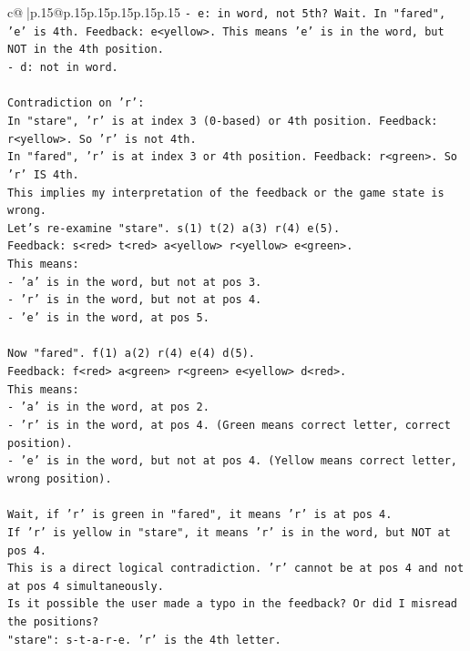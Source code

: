 \documentclass{article}
\begin{document}
{\begin{supertabular}{c@{$\;$}|p{.15\linewidth}@{}p{.15\linewidth}p{.15\linewidth}p{.15\linewidth}p{.15\linewidth}p{.15\linewidth}}
{{{\texttt{{-} e: in word, not 5th? Wait. In "fared", 'e' is 4th. Feedback: e<yellow>. This means 'e' is in the word, but NOT in the 4th position.} \\
\texttt{{-} d: not in word.} \\
\\ 
\texttt{Contradiction on 'r':} \\
\texttt{In "stare", 'r' is at index 3 (0{-}based) or 4th position. Feedback: r<yellow>. So 'r' is not 4th.} \\
\texttt{In "fared", 'r' is at index 3 or 4th position. Feedback: r<green>. So 'r' IS 4th.} \\
\texttt{This implies my interpretation of the feedback or the game state is wrong.} \\
\texttt{Let's re{-}examine "stare". s(1) t(2) a(3) r(4) e(5).} \\
\texttt{Feedback: s<red> t<red> a<yellow> r<yellow> e<green>.} \\
\texttt{This means:} \\
\texttt{{-} 'a' is in the word, but not at pos 3.} \\
\texttt{{-} 'r' is in the word, but not at pos 4.} \\
\texttt{{-} 'e' is in the word, at pos 5.} \\
\\ 
\texttt{Now "fared". f(1) a(2) r(4) e(4) d(5).} \\
\texttt{Feedback: f<red> a<green> r<green> e<yellow> d<red>.} \\
\texttt{This means:} \\
\texttt{{-} 'a' is in the word, at pos 2.} \\
\texttt{{-} 'r' is in the word, at pos 4. (Green means correct letter, correct position).} \\
\texttt{{-} 'e' is in the word, but not at pos 4. (Yellow means correct letter, wrong position).} \\
\\ 
\texttt{Wait, if 'r' is green in "fared", it means 'r' is at pos 4.} \\
\texttt{If 'r' is yellow in "stare", it means 'r' is in the word, but NOT at pos 4.} \\
\texttt{This is a direct logical contradiction. 'r' cannot be at pos 4 and not at pos 4 simultaneously.} \\
\texttt{Is it possible the user made a typo in the feedback? Or did I misread the positions?} \\
\texttt{"stare": s{-}t{-}a{-}r{-}e. 'r' is the 4th letter.} \\
}}}
\end{supertabular}}
\end{document}
